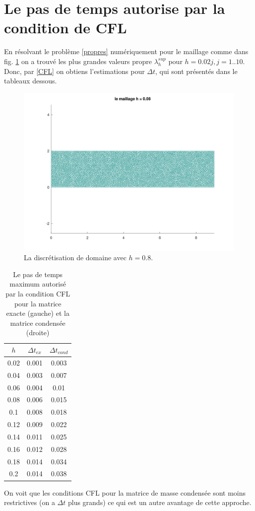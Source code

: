 \documentclass[12pt]{article}
\begin{document}
\section{Le pas de temps autorise par la condition de CFL}
En résolvant le problème \eqref{propres} numériquement pour le maillage comme dans fig. \ref{fig:maillage1} on a trouvé les plus grandes valeurs propre $\lambda^{sup}_h$ pour $h = 0.02j, j = 1..10$. Donc, par \eqref{CFL} on obtiens l'estimations pour $\Delta t$, qui sont présentés dans le tableaux dessous.
	\begin{figure}[h]
	\centering
	\includegraphics[height=0.4\linewidth]{images/maillage1}
	\caption{La discrétisation de domaine  avec $h = 0.8$.}
	\label{fig:maillage1}
\end{figure}
\begin{table}[H]
	\caption{\label{tab:canonsummary} Le pas de temps maximum autorisé par la condition CFL pour la matrice exacte (gauche) et la matrice condensée (droite) }
	\begin{center}
		\begin{tabular}{|c|c|c|}
			\hline
			$h$ & $\Delta t_{ex}$ & $\Delta t_{cond}$ \\
			\hline
			0.02 & 0.001 &  0.003 \\ 
			0.04 & 0.003 & 0.007 \\
			0.06 & 0.004 & 0.01\\
			0.08 & 0.006 & 0.015\\
			0.1  & 0.008 & 0.018\\
			0.12 & 0.009 & 0.022\\
			0.14 & 0.011 & 0.025\\
			0.16 & 0.012 & 0.028\\
			0.18 & 0.014 & 0.034\\
			0.2  & 0.014 & 0.038\\
			\hline
		\end{tabular}
	\end{center}
\end{table} 
On voit que les conditions CFL pour la matrice de masse condensée sont moins restrictives (on a $\Delta t$ plus grands) ce qui est un autre avantage de cette approche.
\end{document}
